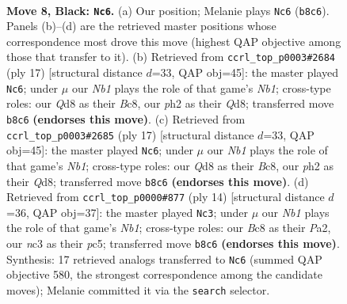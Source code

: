 \documentclass[11pt]{article}
\begin{document}
\begin{figure}[p]\centering
\begin{subfigure}{0.46\textwidth}\centering
\resizebox{\linewidth}{!}{%
\newchessgame
\chessboard[
  setfen={rnbq1rk1/pp2bppp/4pn2/2Pp4/3P4/2N2N2/PP2BPPP/R1BQK2R b KQ - 2 8},
  showmover=false,
  pgfstyle=straightmove, color=movearrow, markmove={b8-c6}
]}
\caption{}
\end{subfigure}\hfill
\begin{subfigure}{0.46\textwidth}\centering
\resizebox{\linewidth}{!}{%
\newchessgame
\chessboard[
  setfen={rnbq1rk1/1p2bppp/p2ppn2/8/2PNP3/2N1BP2/PP2B1PP/R2QK2R b KQ - 5 9},
  showmover=false,
  pgfstyle=straightmove, color=movearrow, markmove={b8-c6}
]}
\caption{}
\end{subfigure}
\\[4pt]
\begin{subfigure}{0.46\textwidth}\centering
\resizebox{\linewidth}{!}{%
\newchessgame
\chessboard[
  setfen={rnbq1rk1/1p2bppp/p2ppn2/8/2PNP3/2N1BP2/PP2B1PP/R2QK2R b KQ - 5 9},
  showmover=false,
  pgfstyle=straightmove, color=movearrow, markmove={b8-c6}
]}
\caption{}
\end{subfigure}\hfill
\begin{subfigure}{0.46\textwidth}\centering
\resizebox{\linewidth}{!}{%
\newchessgame
\chessboard[
  setfen={r1bqk2r/pp2bppp/2n2n2/2pp4/3P4/5NP1/PPP2PBP/RNBQ1RK1 w kq - 3 8},
  showmover=false,
  pgfstyle=straightmove, color=movearrow, markmove={b1-c3}
]}
\caption{}
\end{subfigure}
\caption{\textbf{Move 8, Black: \texttt{Nc6}.} (a) Our position; Melanie plays \texttt{Nc6} (\texttt{b8c6}). Panels (b)--(d) are the retrieved master positions whose correspondence most drove this move (highest QAP objective among those that transfer to it). (b) Retrieved from \texttt{ccrl\_top\_p0003\#2684} (ply 17) [structural distance $d$=33, QAP obj=45]: the master played \texttt{Nc6}; under $\mu$ our \emph{Nb1} plays the role of that game's \emph{Nb1}; cross-type roles: our \emph{Q}d8 as their \emph{B}c8, our \emph{p}h2 as their \emph{Q}d8; transferred move \texttt{b8c6} \textbf{(endorses this move)}. (c) Retrieved from \texttt{ccrl\_top\_p0003\#2685} (ply 17) [structural distance $d$=33, QAP obj=45]: the master played \texttt{Nc6}; under $\mu$ our \emph{Nb1} plays the role of that game's \emph{Nb1}; cross-type roles: our \emph{Q}d8 as their \emph{B}c8, our \emph{p}h2 as their \emph{Q}d8; transferred move \texttt{b8c6} \textbf{(endorses this move)}. (d) Retrieved from \texttt{ccrl\_top\_p0000\#877} (ply 14) [structural distance $d$=36, QAP obj=37]: the master played \texttt{Nc3}; under $\mu$ our \emph{Nb1} plays the role of that game's \emph{Nb1}; cross-type roles: our \emph{B}c8 as their \emph{P}a2, our \emph{n}c3 as their \emph{p}c5; transferred move \texttt{b8c6} \textbf{(endorses this move)}. Synthesis: 17 retrieved analogs transferred to \texttt{Nc6} (summed QAP objective 580, the strongest correspondence among the candidate moves); Melanie committed it via the \texttt{search} selector.}
\label{fig:thought-m15}
\end{figure}
\end{document}
